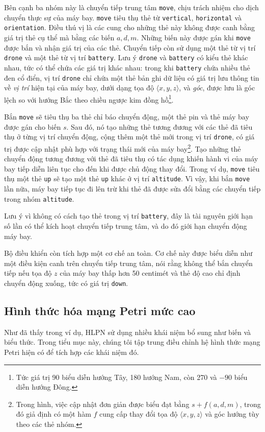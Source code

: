 Bên cạnh ba nhóm này là chuyển tiếp trung tâm \texttt{move}, chịu trách nhiệm cho dịch chuyển thực sự của máy bay. \texttt{move} tiêu thụ thẻ từ \texttt{vertical}, \texttt{horizontal} và \texttt{orientation}. Điều thú vị là các cung cho những thẻ này không được canh bằng giá trị thẻ cụ thể mà bằng các biến $a,d,m$. Những biến này được gán khi \texttt{move} được bắn và nhận giá trị của các thẻ. Chuyển tiếp còn sử dụng một thẻ từ vị trí \texttt{drone} và một thẻ từ vị trí \texttt{battery}. Lưu ý \texttt{drone} và \texttt{battery} có kiểu thẻ khác nhau, tức có thể chứa các giá trị khác nhau: trong khi \texttt{battery} chứa nhiều thẻ đen cổ điển, vị trí \texttt{drone} chỉ chứa một thẻ bản ghi dữ liệu có giá trị lưu thông tin về \emph{vị trí} hiện tại của máy bay, dưới dạng tọa độ $\langle x,y,z\rangle$, và \emph{góc}, được lưu là góc lệch so với hướng Bắc theo chiều ngược kim đồng hồ\footnote{Tức giá trị 90 biểu diễn hướng Tây, 180 hướng Nam, còn 270 và $-90$ biểu diễn hướng Đông.}.

Bắn \texttt{move} sẽ tiêu thụ ba thẻ chỉ báo chuyển động, một thẻ pin và thẻ máy bay được gán cho biến $s$. Sau đó, nó tạo những thẻ tương đương với các thẻ đã tiêu thụ ở từng vị trí chuyển động, cộng thêm một thẻ mới trong vị trí \texttt{drone}, có giá trị được cập nhật phù hợp với trạng thái mới của máy bay\footnote{Trong hình, việc cập nhật đơn giản được biểu đạt bằng $s+f(a,d,m)$, trong đó giả định có một hàm $f$ cung cấp thay đổi tọa độ $\langle x,y,z\rangle$ và góc hướng tùy theo các thẻ nhóm.}. Tạo những thẻ chuyển động tương đương với thẻ đã tiêu thụ có tác dụng khiến hành vi của máy bay tiếp diễn liên tục cho đến khi được chủ động thay đổi. Trong ví dụ, \texttt{move} tiêu thụ một thẻ \texttt{up} sẽ tạo một thẻ \texttt{up} khác ở vị trí \texttt{altitude}. Vì vậy, khi bắn \texttt{move} lần nữa, máy bay tiếp tục đi lên trừ khi thẻ đã được sửa đổi bằng các chuyển tiếp trong nhóm \texttt{altitude}.

Lưu ý vì không có cách tạo thẻ trong vị trí \texttt{battery}, đây là tài nguyên giới hạn số lần có thể kích hoạt chuyển tiếp trung tâm, và do đó giới hạn chuyển động máy bay.

Bộ điều khiển còn tích hợp một cơ chế an toàn. Cơ chế này được biểu diễn như một điều kiện canh trên chuyển tiếp trung tâm, nói rằng không thể bắn chuyển tiếp nếu tọa độ $z$ của máy bay thấp hơn 50 centimét và thẻ độ cao chỉ định chuyển động xuống, tức có giá trị \texttt{down}.

\subsection{Hình thức hóa mạng Petri mức cao}
Như đã thấy trong ví dụ, HLPN sử dụng nhiều khái niệm bổ sung như biến và biểu thức. Trong tiểu mục này, chúng tôi tập trung điều chỉnh hệ hình thức mạng Petri hiện có để tích hợp các khái niệm đó.

